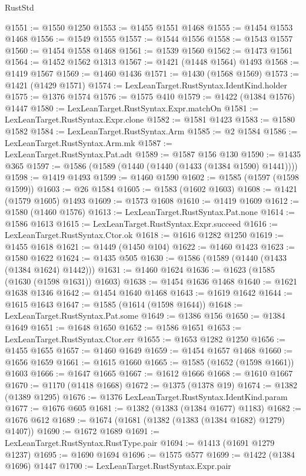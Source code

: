 \begin{lexlean}{RustStd}
\begin{coremodule}
@1551 := @1550 @1250
@1553 := @1455 @1551 @1468
@1555 := @1454 @1553 @1468
@1556 := @1549 @1555
@1557 := @1544 @1556
@1558 := @1543 @1557
@1560 := @1454 @1558 @1468
@1561 := @1539 @1560
@1562 := @1473 @1561
@1564 := @1452 @1562 @1313
@1567 := @1421 (@1448 @1564) @1493
@1568 := @1419 @1567
@1569 := @1460 @1436
@1571 := @1430 (@1568 @1569)
@1573 := @1421 (@1429 @1571)
@1574 := LexLeanTarget.RustSyntax.IdentKind.holder
@1575 := @1376 @1574
@1576 := @1575 @410
@1579 := @1422 (@1384 @1576) @1447
@1580 := LexLeanTarget.RustSyntax.Expr.matchOn
@1581 := LexLeanTarget.RustSyntax.Expr.clone
@1582 := @1581 @1423
@1583 := @1580 @1582
@1584 := LexLeanTarget.RustSyntax.Arm
@1585 := @2 @1584
@1586 := LexLeanTarget.RustSyntax.Arm.mk
@1587 := LexLeanTarget.RustSyntax.Pat.adt
@1589 := @1587 @156 @130
@1590 := @1435 @365
@1597 := @1586 (@1589 (@1440 (@1440 (@1433 (@1384 @1590) @1441))))
@1598 := @1419 @1493
@1599 := @1460 @1590
@1602 := @1585 (@1597 (@1598 @1599))
@1603 := @26 @1584
@1605 := @1583 (@1602 @1603)
@1608 := @1421 (@1579 @1605) @1493
@1609 := @1573 @1608
@1610 := @1419 @1609
@1612 := @1580 (@1460 @1576)
@1613 := LexLeanTarget.RustSyntax.Pat.none
@1614 := @1586 @1613
@1615 := LexLeanTarget.RustSyntax.Expr.succeed
@1616 := LexLeanTarget.RustSyntax.Ctor.ok
@1618 := @1616 @1282 @1250
@1619 := @1455 @1618
@1621 := @1449 (@1450 @104)
@1622 := @1460 @1423
@1623 := @1580 @1622
@1624 := @1435 @505
@1630 := @1586 (@1589 (@1440 (@1433 (@1384 @1624) @1442)))
@1631 := @1460 @1624
@1636 := @1623 (@1585 (@1630 (@1598 @1631)) @1603)
@1638 := @1454 @1636 @1468
@1640 := @1621 @1638 @1346
@1642 := @1454 @1640 @1468
@1643 := @1619 @1642
@1644 := @1615 @1643
@1647 := @1585 (@1614 (@1598 @1644))
@1648 := LexLeanTarget.RustSyntax.Pat.some
@1649 := @1386 @156
@1650 := @1384 @1649
@1651 := @1648 @1650
@1652 := @1586 @1651
@1653 := LexLeanTarget.RustSyntax.Ctor.err
@1655 := @1653 @1282 @1250
@1656 := @1455 @1655
@1657 := @1460 @1649
@1659 := @1454 @1657 @1468
@1660 := @1656 @1659
@1661 := @1615 @1660
@1665 := @1585 (@1652 (@1598 @1661)) @1603
@1666 := @1647 @1665
@1667 := @1612 @1666
@1668 := @1610 @1667
@1670 := @1170 (@1418 @1668)
@1672 := @1375 (@1378 @19)
@1674 := @1382 (@1389 @1295)
@1676 := @1376 LexLeanTarget.RustSyntax.IdentKind.param
@1677 := @1676 @605
@1681 := @1382 (@1383 (@1384 @1677) @1183)
@1682 := @1676 @612
@1689 := @1674 (@1681 (@1382 (@1383 (@1384 @1682) @1279) @1407))
@1690 := @1672 @1689
@1691 := LexLeanTarget.RustSyntax.RustType.pair
@1694 := @1413 (@1691 @1279 @1237)
@1695 := @1690 @1694
@1696 := @1575 @577
@1699 := @1422 (@1384 @1696) @1447
@1700 := LexLeanTarget.RustSyntax.Expr.pair

\end{coremodule}
\end{lexlean}
